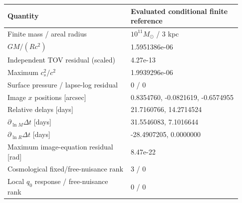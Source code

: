 \begin{tabular}{p{0.49\linewidth}p{0.44\linewidth}}
\toprule
Quantity & Evaluated conditional finite reference \\
\midrule
Finite mass / areal radius & $10^{11}M_\odot$ / $3$ kpc \\
$GM/(Rc^2)$ & 1.5951386e-06 \\
Independent TOV residual (scaled) & 4.27e-13 \\
Maximum $c_s^2/c^2$ & 1.9939296e-06 \\
Surface pressure / lapse-log residual & 0 / 0 \\
Image $x$ positions [arcsec] & 0.8354760, -0.0821619, -0.6574955 \\
Relative delays [days] & 21.7160766, 14.2714524 \\
$\partial_{\ln M}\Delta t$ [days] & 31.5546083, 7.1016644 \\
$\partial_{\ln R}\Delta t$ [days] & -28.4907205, 0.0000000 \\
Maximum image-equation residual [rad] & 8.47e-22 \\
Cosmological fixed/free-nuisance rank & 3 / 0 \\
Local $q_0$ response / free-nuisance rank & $0$ / $0$ \\
\bottomrule
\end{tabular}
